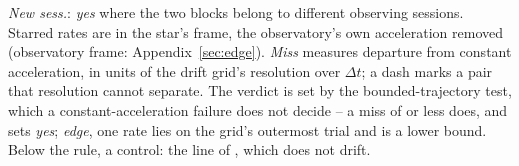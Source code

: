 \begin{table}
\centering
\caption{\textbf{Can two crossings be one carrier?} The \TjNPair{} pairs
toward one star with an unattributed member (\S\ref{sec:etacrv}); the note
below defines the columns and the verdicts.}
\label{tab:pairs}
\scriptsize

\par\vspace{2pt}
{\scriptsize \emph{New sess.}: \emph{yes} where the two blocks belong to different
observing sessions. Starred rates are in the star's frame, the observatory's
own acceleration removed (observatory frame: Appendix~\ref{sec:edge}). \emph{Miss} measures
departure from constant acceleration, in units of the drift grid's resolution
over $\Delta t$; a dash marks a pair that resolution cannot separate. The
verdict is set by the bounded-trajectory test, which a constant-acceleration
failure does not decide -- a miss of \TjAcceptSig{} or less does, and sets
\emph{yes}; \emph{edge}, one rate lies on the grid's outermost trial and is
a lower bound. Below the rule, a control: the \TjCtlLine{} line of
\TjCtlStar, which does not drift.\par}
\end{table}

\begin{table}
\centering
\caption{\textbf{The two events}, the crossings whose
stellar statistic exceeds all \NCtrl{} control positions of their own window.
\S\ref{sec:vistest} reads them.}
\label{tab:cand}
\footnotesize

\end{table}

